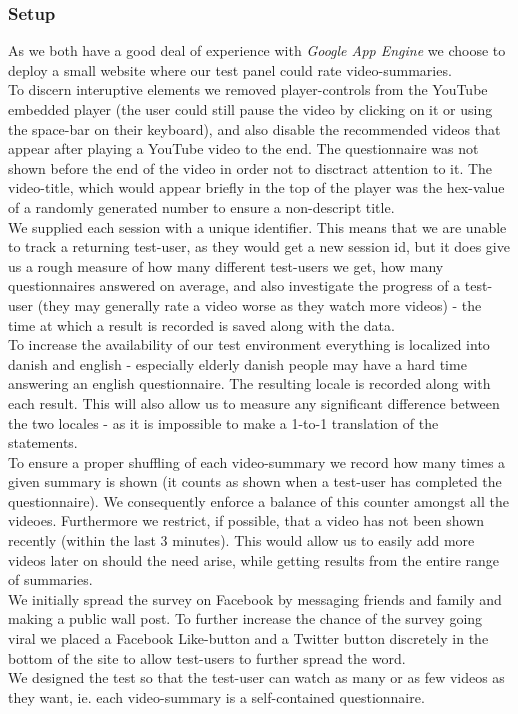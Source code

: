 \subsubsection{Setup}
%
As we both have a good deal of experience with \textit{Google App Engine} we choose to deploy a small website where our test panel could rate video-summaries.\\%
%
%
%
%
To discern interuptive elements we removed player-controls from the YouTube embedded player (the user could still pause the video by clicking on it or using the space-bar on their keyboard), and also disable the recommended videos that appear after playing a YouTube video to the end. The questionnaire was not shown before the end of the video in order not to disctract attention to it. The video-title, which would appear briefly in the top of the player was the hex-value of a randomly generated number to ensure a non-descript title.\\
We supplied each session with a unique identifier. This means that we are unable to track a returning test-user, as they would get a new session id, but it does give us a rough measure of how many different test-users we get, how many questionnaires answered on average, and also investigate the progress of a test-user (they may generally rate a video worse as they watch more videos) - the time at which a result is recorded is saved along with the data.\\
To increase the availability of our test environment everything is localized into danish and english - especially elderly danish people may have a hard time answering an english questionnaire.
%
%
The resulting locale is recorded along with each result. This will also allow us to measure any significant difference between the two locales - as it is impossible to make a 1-to-1 translation of the statements.\\
To ensure a proper shuffling of each video-summary we record how many times a given summary is shown (it counts as shown when a test-user has completed the questionnaire). We consequently enforce a balance of this counter amongst all the videoes. Furthermore we restrict, if possible, that a video has not been shown recently (within the last 3 minutes). This would allow us to easily add more videos later on should the need arise, while getting results from the entire range of summaries.\\
%
%
%
%
We initially spread the survey on Facebook by messaging friends and family and making a public wall post. To further increase the chance of the survey going viral we placed a Facebook Like-button and a Twitter button discretely in the bottom of the site to allow test-users to further spread the word.\\
We designed the test so that the test-user can watch as many or as few videos as they want, ie. each video-summary is a self-contained questionnaire.
%
